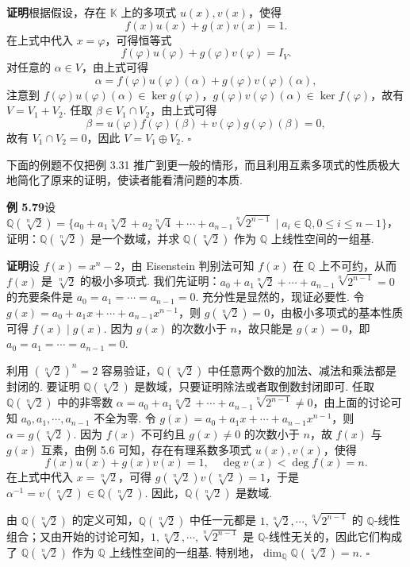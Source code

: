 \documentclass[UTF8,12pt,a4paper,fontset=fandol]{ctexart}
\begin{document}
\noindent\textbf{证明}\quad 根据假设，存在 $\mathbb{K}$ 上的多项式 $u(x),v(x)$，使得
\[
f(x)u(x)+g(x)v(x)=1.
\]
在上式中代入 $x=\varphi$，可得恒等式
\[
f(\varphi)u(\varphi)+g(\varphi)v(\varphi)=I_V.
\]
对任意的 $\alpha\in V$，由上式可得
\[
\alpha=f(\varphi)u(\varphi)(\alpha)+g(\varphi)v(\varphi)(\alpha),
\]
注意到 $f(\varphi)u(\varphi)(\alpha)\in\ker g(\varphi)$，$g(\varphi)v(\varphi)(\alpha)\in\ker f(\varphi)$，故有 $V=V_1+V_2$. 任取 $\beta\in V_1\cap V_2$，由上式可得
\[
\beta=u(\varphi)f(\varphi)(\beta)+v(\varphi)g(\varphi)(\beta)=0,
\]
故有 $V_1\cap V_2=0$，因此 $V=V_1\oplus V_2$. \hfill $\square$

下面的例题不仅把例 3.31 推广到更一般的情形，而且利用互素多项式的性质极大地简化了原来的证明，使读者能看清问题的本质.

\noindent\textbf{例 5.79}\quad 设 $\mathbb{Q}(\sqrt[n]{2})=\{a_0+a_1\sqrt[n]{2}+a_2\sqrt[n]{4}+\cdots+a_{n-1}\sqrt[n]{2^{n-1}}\mid a_i\in\mathbb{Q},0\le i\le n-1\}$，证明：$\mathbb{Q}(\sqrt[n]{2})$ 是一个数域，并求 $\mathbb{Q}(\sqrt[n]{2})$ 作为 $\mathbb{Q}$ 上线性空间的一组基.

\noindent\textbf{证明}\quad 设 $f(x)=x^n-2$，由 Eisenstein 判别法可知 $f(x)$ 在 $\mathbb{Q}$ 上不可约，从而 $f(x)$ 是 $\sqrt[n]{2}$ 的极小多项式. 我们先证明：$a_0+a_1\sqrt[n]{2}+\cdots+a_{n-1}\sqrt[n]{2^{n-1}}=0$ 的充要条件是 $a_0=a_1=\cdots=a_{n-1}=0$. 充分性是显然的，现证必要性. 令 $g(x)=a_0+a_1x+\cdots+a_{n-1}x^{n-1}$，则 $g(\sqrt[n]{2})=0$，由极小多项式的基本性质可得 $f(x)\mid g(x)$. 因为 $g(x)$ 的次数小于 $n$，故只能是 $g(x)=0$，即 $a_0=a_1=\cdots=a_{n-1}=0$.

利用 $(\sqrt[n]{2})^n=2$ 容易验证，$\mathbb{Q}(\sqrt[n]{2})$ 中任意两个数的加法、减法和乘法都是封闭的. 要证明 $\mathbb{Q}(\sqrt[n]{2})$ 是数域，只要证明除法或者取倒数封闭即可. 任取 $\mathbb{Q}(\sqrt[n]{2})$ 中的非零数 $\alpha=a_0+a_1\sqrt[n]{2}+\cdots+a_{n-1}\sqrt[n]{2^{n-1}}\ne0$，由上面的讨论可知 $a_0,a_1,\cdots,a_{n-1}$ 不全为零. 令 $g(x)=a_0+a_1x+\cdots+a_{n-1}x^{n-1}$，则 $\alpha=g(\sqrt[n]{2})$. 因为 $f(x)$ 不可约且 $g(x)\ne0$ 的次数小于 $n$，故 $f(x)$ 与 $g(x)$ 互素，由例 5.6 可知，存在有理系数多项式 $u(x),v(x)$，使得
\[
f(x)u(x)+g(x)v(x)=1,\quad \deg v(x)<\deg f(x)=n.
\]
在上式中代入 $x=\sqrt[n]{2}$，可得 $g(\sqrt[n]{2})v(\sqrt[n]{2})=1$，于是 $\alpha^{-1}=v(\sqrt[n]{2})\in\mathbb{Q}(\sqrt[n]{2})$. 因此，$\mathbb{Q}(\sqrt[n]{2})$ 是数域.

由 $\mathbb{Q}(\sqrt[n]{2})$ 的定义可知，$\mathbb{Q}(\sqrt[n]{2})$ 中任一元都是 $1,\sqrt[n]{2},\cdots,\sqrt[n]{2^{n-1}}$ 的 $\mathbb{Q}$-线性组合；又由开始的讨论可知，$1,\sqrt[n]{2},\cdots,\sqrt[n]{2^{n-1}}$ 是 $\mathbb{Q}$-线性无关的，因此它们构成了 $\mathbb{Q}(\sqrt[n]{2})$ 作为 $\mathbb{Q}$ 上线性空间的一组基. 特别地，$\dim_{\mathbb{Q}}\mathbb{Q}(\sqrt[n]{2})=n$. \hfill $\square$
\end{document}
